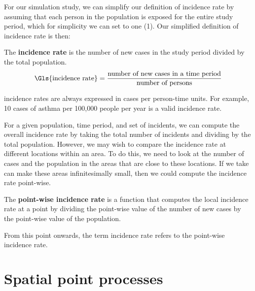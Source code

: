 For our simulation study, we can simplify our definition of \gls{incidence rate} by assuming that each person in the population is exposed for the entire study period,
which for simplicity we can set to one (1).
Our simplified definition of incidence rate is then:

\begin{defn}
    The \textbf{\gls{incidence rate}} is the number of new cases in the study period divided by the total population.
    \begin{equation}
        \label{eq:incidencerate}
        \mbox{\Gls{incidence rate}} = \frac{\mbox{number of new cases in a time period}}
                                        {\mbox{number of persons}}
    \end{equation}
\end{defn}

\Glspl{incidence rate} are always expressed in cases per person-time units.
For example, 10 cases of asthma per 100,000 people per year is a valid \gls{incidence rate}.

For a given population, time period, and set of \glspl{incident},
we can compute the overall \gls{incidence rate} by taking the total number of \glspl{incident} and dividing by the total population.
However, we may wish to compare the \gls{incidence rate} at different locations within an area.
To do this, we need to look at the number of cases and the population in the areas that are close to these locations.
If we take can make these areas infinitesimally small,
then we could compute the \gls{incidence rate} point-wise.

\begin{defn}
    \label{defn:incidence_rate}
    The \textbf{point-wise \gls{incidence rate}} is a function that computes the local \gls{incidence rate} at a point by dividing the point-wise value of the number of new cases by the point-wise value of the population.
\end{defn}

From this point onwards, the term \gls{incidence rate} refers to the point-wise \gls{incidence rate}.

\section{Spatial point processes}
\label{sec:theory:spatial_point_processes}

